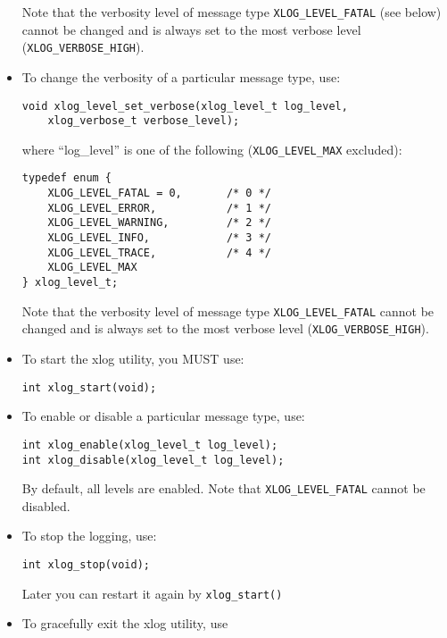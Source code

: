 \documentclass[11pt]{article}
\begin{document}
\begin{itemize}
   Note that the verbosity level of message type \verb=XLOG_LEVEL_FATAL= (see
   below) cannot be changed and is always set to the most verbose level
   (\verb=XLOG_VERBOSE_HIGH=).

  \item To change the verbosity of a particular message type, use:

\begin{verbatim}
void xlog_level_set_verbose(xlog_level_t log_level,
	xlog_verbose_t verbose_level);
\end{verbatim}

where ``log\_level'' is one of the following (\verb=XLOG_LEVEL_MAX=
excluded):

\begin{verbatim}
typedef enum {
    XLOG_LEVEL_FATAL = 0,       /* 0 */
    XLOG_LEVEL_ERROR,           /* 1 */
    XLOG_LEVEL_WARNING,         /* 2 */
    XLOG_LEVEL_INFO,            /* 3 */
    XLOG_LEVEL_TRACE,           /* 4 */
    XLOG_LEVEL_MAX
} xlog_level_t;
\end{verbatim}

   Note that the verbosity level of message type \verb=XLOG_LEVEL_FATAL=
   cannot be changed and is always set to the most verbose level
   (\verb=XLOG_VERBOSE_HIGH=).

  \item To start the xlog utility, you MUST use:

\begin{verbatim}
int xlog_start(void);
\end{verbatim}


  \item To enable or disable a particular message type, use:

\begin{verbatim}
int xlog_enable(xlog_level_t log_level);
int xlog_disable(xlog_level_t log_level);
\end{verbatim}

	By default, all levels are enabled.
	Note that \verb=XLOG_LEVEL_FATAL= cannot be disabled.

  \item To stop the logging, use:

\begin{verbatim}
int xlog_stop(void);
\end{verbatim}

	Later you can restart it again by \verb=xlog_start()=

  \item To gracefully exit the xlog utility, use


\end{itemize}
\end{document}
